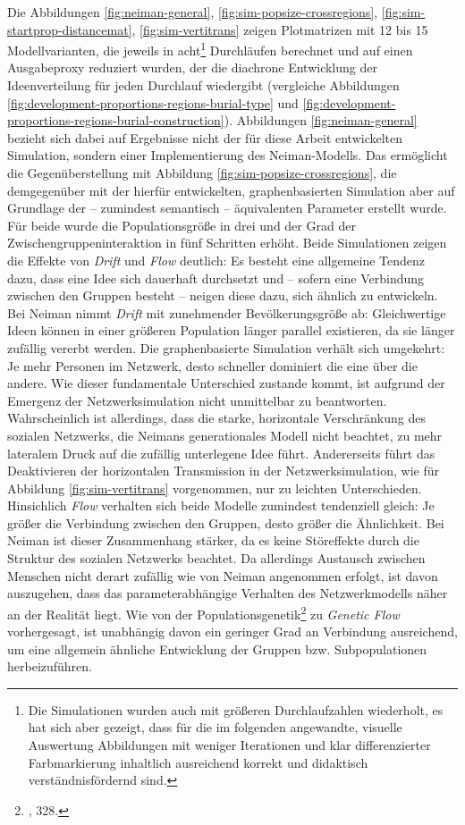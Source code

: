 \documentclass[openany,twoside,twocolumn]{book}
\let\rmarkdownfootnote\footnote%
\def\footnote{\protect\rmarkdownfootnote}
\begin{document}
Die Abbildungen \ref{fig:neiman-general},
\ref{fig:sim-popsize-crossregions}, \ref{fig:sim-startprop-distancemat},
\ref{fig:sim-vertitrans} zeigen Plotmatrizen mit 12 bis 15
Modellvarianten, die jeweils in acht\footnote{Die Simulationen wurden
  auch mit größeren Durchlaufzahlen wiederholt, es hat sich aber
  gezeigt, dass für die im folgenden angewandte, visuelle Auswertung
  Abbildungen mit weniger Iterationen und klar differenzierter
  Farbmarkierung inhaltlich ausreichend korrekt und didaktisch
  verständnisfördernd sind.} Durchläufen berechnet und auf einen
Ausgabeproxy reduziert wurden, der die diachrone Entwicklung der
Ideenverteilung für jeden Durchlauf wiedergibt (vergleiche Abbildungen
\ref{fig:development-proportions-regions-burial-type} und
\ref{fig:development-proportions-regions-burial-construction}).
Abbildungen \ref{fig:neiman-general} bezieht sich dabei auf Ergebnisse
nicht der für diese Arbeit entwickelten Simulation, sondern einer
Implementierung des Neiman-Modells. Das ermöglicht die Gegenüberstellung
mit Abbildung \ref{fig:sim-popsize-crossregions}, die demgegenüber mit
der hierfür entwickelten, graphenbasierten Simulation aber auf Grundlage
der -- zumindest semantisch -- äquivalenten Parameter erstellt wurde.
Für beide wurde die Populationsgröße in drei und der Grad der
Zwischengruppeninteraktion in fünf Schritten erhöht. Beide Simulationen
zeigen die Effekte von \emph{Drift} und \emph{Flow} deutlich: Es besteht
eine allgemeine Tendenz dazu, dass eine Idee sich dauerhaft durchsetzt
und -- sofern eine Verbindung zwischen den Gruppen besteht -- neigen
diese dazu, sich ähnlich zu entwickeln. Bei Neiman nimmt \emph{Drift}
mit zunehmender Bevölkerungsgröße ab: Gleichwertige Ideen können in
einer größeren Population länger parallel existieren, da sie länger
zufällig vererbt werden. Die graphenbasierte Simulation verhält sich
umgekehrt: Je mehr Personen im Netzwerk, desto schneller dominiert die
eine über die andere. Wie dieser fundamentale Unterschied zustande
kommt, ist aufgrund der Emergenz der Netzwerksimulation nicht
unmittelbar zu beantworten. Wahrscheinlich ist allerdings, dass die
starke, horizontale Verschränkung des sozialen Netzwerks, die Neimans
generationales Modell nicht beachtet, zu mehr lateralem Druck auf die
zufällig unterlegene Idee führt. Andererseits führt das Deaktivieren der
horizontalen Transmission in der Netzwerksimulation, wie für Abbildung
\ref{fig:sim-vertitrans} vorgenommen, nur zu leichten Unterschieden.
Hinsichlich \emph{Flow} verhalten sich beide Modelle zumindest
tendenziell gleich: Je größer die Verbindung zwischen den Gruppen, desto
größer die Ähnlichkeit. Bei Neiman ist dieser Zusammenhang stärker, da
es keine Störeffekte durch die Struktur des sozialen Netzwerks beachtet.
Da allerdings Austausch zwischen Menschen nicht derart zufällig wie von
Neiman angenommen erfolgt, ist davon auszugehen, dass das
parameterabhängige Verhalten des Netzwerkmodells näher an der Realität
liegt. Wie von der Populationsgenetik\footnote{\textcite{frankham_introduction_2002},
  328.} zu \emph{Genetic Flow} vorhergesagt, ist unabhängig davon ein
geringer Grad an Verbindung ausreichend, um eine allgemein ähnliche
Entwicklung der Gruppen bzw. Subpopulationen herbeizuführen.
\end{document}
